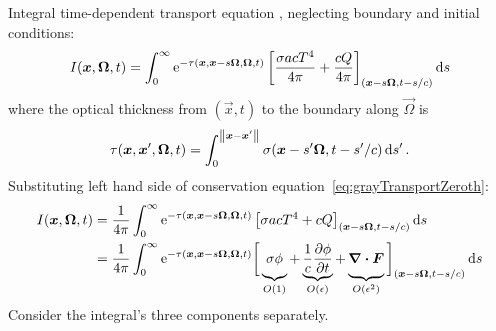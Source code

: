 \documentclass{beamer}
\begin{document}
\begin{frame}
  Integral time-dependent transport equation \cite{Pri2010}, neglecting
  boundary and initial conditions:
  \begin{equation} \label{eq:integralAngularFluxShortened}
    I(\bm{x}, \bm{\Omega}, t)
    = \int_{0}^{\infty}
    \mathop{}\!\mathrm{e}^{ -\tau(\bm{x}, \bm{x} - s \bm{\Omega}, \bm{\Omega}, t)}
    \left[ \frac{\sigma a c T^4}{4\pi} + \frac{c Q}{4\pi} \right]_{(\bm{x} - s
    \bm{\Omega}, t-s/c)} \mathop{}\!\mathrm{d} s
  \end{equation}
  where the optical thickness from $(\vec{x},t)$ to the boundary along
  $\vec{\Omega}$ is
  \begin{equation} \label{eq:integralTrtTauDefinition}
    \tau(\bm{x}, \bm{x}', \bm{\Omega}, t) = \int_{0}^{\left\| \bm{x} -
    \bm{x}' \right\|} \sigma(\bm{x}-s'\bm{\Omega}, t-s'/c) \mathop{}\!\mathrm{d} s' \,.
  \end{equation}
  Substituting left hand side of conservation
  equation~\eqref{eq:grayTransportZeroth}:
  \begin{align}
    I(\bm{x}, \bm{\Omega}, t)
    &= \frac{1}{4\pi} \int_{0}^{\infty}
    \mathop{}\!\mathrm{e}^{ -\tau(\bm{x}, \bm{x} - s \bm{\Omega}, \bm{\Omega}, t)}
    \left[ \sigma a c T^4 + cQ \right]_{(\bm{x} - s \bm{\Omega}, t-s/c)} \mathop{}\!\mathrm{d} s
    \nonumber\\
    &= \frac{1}{4\pi}\int_{0}^{\infty}
    \mathop{}\!\mathrm{e}^{ -\tau(\bm{x}, \bm{x} - s \bm{\Omega}, \bm{\Omega}, t)}
    \bigg[
    \underbrace{\sigma \phi\vphantom{\frac1c}}_{O(1)}
    + \underbrace{\frac{1}{c} \frac{\partial \phi}{\partial t}}_{O(\epsilon)}
    + \underbrace{\bm{\nabla} \bm{\cdot} \bm{F}\vphantom{\frac1c}}_{O(\epsilon^2)}
    \bigg]_{(\bm{x} - s \bm{\Omega}, t-s/c)} \mathop{}\!\mathrm{d} s
    \label{eq:integralTrtRhs}
  \end{align}
  Consider the integral's three components separately.
\end{frame}
\end{document}
